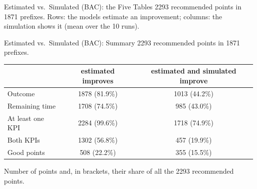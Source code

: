 \documentclass[aspectratio=169]{beamer} %
\begin{document}

\begin{frame}{Estimated vs.\ Simulated (BAC): the Five Tables}
  \footnotesize
  2293 recommended points in 1871 prefixes. Rows: the models estimate an improvement; columns: the
  simulation shows it (mean over the 10 runs).
  \par\vspace{0.3cm}\noindent
  \hfill
  \hfill
  \par\vspace{0.5cm}\noindent\hspace*{\fill}%
  \hspace{0.08\textwidth}%
  \hspace*{\fill}
\end{frame}

\begin{frame}{Estimated vs.\ Simulated (BAC): Summary}
  \footnotesize\setlength{\aboverulesep}{0pt}\setlength{\belowrulesep}{1pt}
  2293 recommended points in 1871 prefixes.
  \begin{center}\setlength{\tabcolsep}{6pt}
  \begin{tabular}{lcc}
    \toprule
     & estimated improves & estimated and simulated improve \\
    \midrule
    Outcome & 1878 (81.9\%) & 1013 (44.2\%) \\
    Remaining time & 1708 (74.5\%) & 985 (43.0\%) \\
    At least one KPI & 2284 (99.6\%) & 1718 (74.9\%) \\
    Both KPIs & 1302 (56.8\%) & 457 (19.9\%) \\
    Good points & 508 (22.2\%) & 355 (15.5\%) \\
    \bottomrule
  \end{tabular}
  \end{center}
  {\scriptsize Number of points and, in brackets, their share of all the 2293 recommended points.}
\end{frame}
\end{document}
